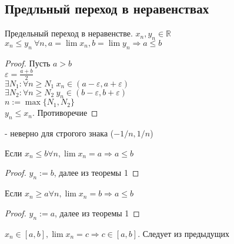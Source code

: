 \subsection{Предльный переход в неравенствах}

    
    \begin{theorem-non}
        Предельный переход в неравенстве. $x_n, y_n \in \mathbb{R}$ \\
        $x_n \leqslant y_n\ \forall n, a=\lim x_n, b=\lim y_n \Longrightarrow a\leqslant b$
    \end{theorem-non}
        
    \begin{proof}
        Пусть $a>b$ \\
        $\varepsilon = \frac{a+b}{2}$ \\
        $\exists N_1: \forall n\geqslant N_1\ x_n\in (a-\varepsilon, a+\varepsilon)$ \\
        $\exists N_2: \forall n\geqslant N_2\ y_n \in (b-\varepsilon, b+\varepsilon)$ \\
        $n:=\max\{N_1, N_2\}$ \\
        $y_n \leqslant x_n$. Противоречие
    \end{proof}
    
    \notice - неверно для строгого знака ($-1/n, 1/n$)
    
    \follow \; Если $x_n \leqslant b \forall n, \lim x_n = a \Longrightarrow a\leqslant b$
    \begin{proof}
        $y_n:=b$, далее из теоремы 1
    \end{proof}
    \follow \; Если $x_n \geqslant a \forall n, \lim x_n = b \Longrightarrow a \leqslant b$

    \begin{proof}
        $y_n:=a$, далее из теоремы 1
    \end{proof}
    
    \follow \; $x_n \in [a, b], \lim x_n = c \Longrightarrow c \in [a, b]$. 
    Следует из предыдущих